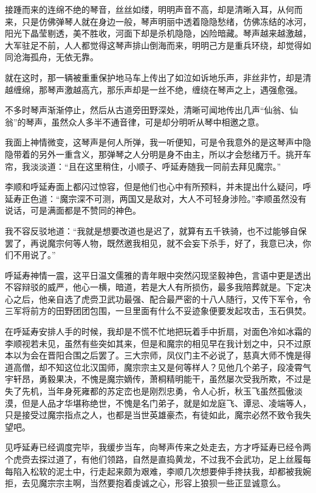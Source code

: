 接踵而来的连绵不绝的琴音，丝丝如缕，明明声音不高，却是清晰入耳，从何而来，只是仿佛弹琴人就在身边一般，琴声明丽中透着隐隐愁绪，仿佛冻结的冰河，阳光下晶莹剔透，美不胜收，河面下却是杀机隐隐，凶险暗藏。琴声越来越激越，大军驻足不前，人人都觉得这琴声排山倒海而来，明明己方是重兵环绕，却觉得如同沧海孤舟，无依无靠。

就在这时，那一辆被重重保护地马车上传出了如泣如诉地乐声，非丝非竹，却是清越缠绵，那琴声激越高亢，那乐声却是一丝不绝，缠绕在琴声之上，遇强愈强。

不多时琴声渐渐停止，然后从古道旁田野深处，清晰可闻地传出几声“仙翁、仙翁”的琴声，虽然众人多半不通音律，可是却分明听从琴中相邀之意。

我面上神情微变，这琴声是何人所弹，我一听便知，可是令我意外的是这琴声中隐隐带着的另外一重含义，那弹琴之人分明是身不由主，所以才会愁绪万千。挑开车帘，我淡淡道：“且在这里稍住，小顺子、呼延寿随我一同前去拜见魔宗。”

李顺和呼延寿面上都闪过惊容，但是他们也心中有所预料，并未提出什么疑问，呼延寿正色道：“魔宗深不可测，两国又是敌对，大人不可轻身涉险。”李顺虽然没有说话，可是满面都是不赞同的神色。

我不容反驳地道：“我就是想要改道也是迟了，就算有五千铁骑，也不过能够自保罢了，再说魔宗何等人物，既然邀我相见，就不会妄下杀手，好了，我意已决，你们不用说了。”

呼延寿神情一震，这平日温文儒雅的青年眼中突然闪现坚毅神色，言语中更是透出不容辩驳的威严，他心一横，暗道，若是大人有所损伤，最多我陪葬就是。下定决心之后，他亲自选了虎赍卫武功最强、配合最严密的十八人随行，又传下军令，令三军将前方的田野团团包围，一旦里面有什么不妥迹象便要发起攻击，玉石俱焚。

在呼延寿安排人手的时候，我却是不慌不忙地把玩着手中折扇，对面色冷如冰霜的李顺视若未见，虽然有些突如其来，但是和魔宗的相见早在我计划之中，只不过原本以为会在晋阳合围之后罢了。三大宗师，凤仪门主不必说了，慈真大师不愧是得道高僧，却不知这位北汉国师，魔宗宗主又是何等样人？见他几个弟子，段凌霄气宇轩昂，勇毅果决，不愧是魔宗嫡传，萧桐精明能干，虽然屡次受我所欺，不过是失了先机，当年身死雍都的苏定峦也是刚烈忠勇，令人心折，秋玉飞虽然孤傲淡漠，但是人品才华堪称绝世，不愧是名门弟子，就是如龙庭飞、谭忌、凌端等人，只是接受过魔宗指点之人，也都是当世英雄豪杰，有徒如此，魔宗必然不致令我失望吧。

见呼延寿已经调度完毕，我缓步当车，向琴声传来之处走去，方才呼延寿已经令两个虎赍去探过道了，有他们领路，自然是直捣黄龙，不过我不会武功，足上丝履每每陷入松软的泥土中，行走起来颇为艰难，李顺几次想要伸手搀扶我，却都被我婉拒，去见魔宗宗主啊，当然要抱着虔诚之心，形容上狼狈一些正显诚意么。

